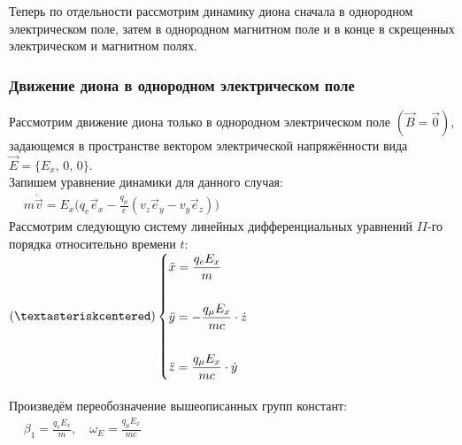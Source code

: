 \documentclass[oneside,final,14pt]{extarticle}
\begin{document}
	\noindent Теперь по отдельности рассмотрим динамику диона сначала в однородном электрическом поле, затем в однородном магнитном поле и в конце в скрещенных электрическом и магнитном полях.
	
	\subsubsection{Движение диона в однородном электрическом поле}
	
	\noindent Рассмотрим движение диона только в однородном электрическом поле $(\vec{B} = \vec{0})$, задающемся в пространстве вектором электрической напряжённости вида $\vec{E} = \{E_{x},\, 0,\, 0\}$. \\
	
	\noindent Запишем уравнение динамики для данного случая: \\
	
	\begin{math}
		\begin{aligned}
			& m\dot{\vec{v}} = E_{x}\Big(q_{e}\vec{e}_{x} - \frac{q_{\mu}}{c}\left(v_{z}\vec{e}_{y} - v_{y}\vec{e}_{z}\right)\Big)
		\end{aligned}
	\end{math} \\
	
	\noindent Рассмотрим следующую систему линейных дифференциальных уравнений $II$-го порядка относительно времени $t$: \\
	
	\begin{math}
		(\textasteriskcentered) \left\{
		\begin{aligned}
			& \ddot{x} = \frac{q_{e}E_{x}}{m} \\\\
			& \ddot{y} = -\frac{q_{\mu}E_{x}}{mc} \cdot \dot{z} \\\\
			& \ddot{z} = \frac{q_{\mu}E_{x}}{mc} \cdot \dot{y}
		\end{aligned}
		\right.
	\end{math} \\\\
	
	\noindent Произведём переобозначение вышеописанных групп констант: \\
	
	\begin{math}
		\begin{aligned}
			& \beta_{1} = \frac{q_{e}E_{x}}{m}, \quad \omega_{E} = \frac{q_{\mu}E_{x}}{mc}
		\end{aligned}
	\end{math} \\
	
\end{document}
